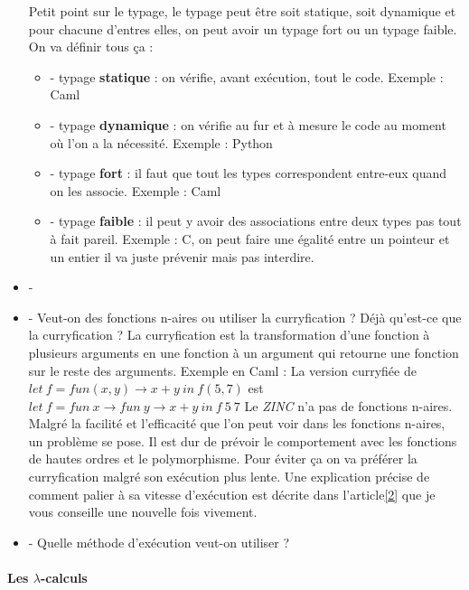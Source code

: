 \documentclass[10pt,a4paper]{article}
\begin{document}
\begin{itemize}
					Petit point sur le typage, le typage peut être soit statique, soit dynamique et pour chacune d'entres elles, on peut avoir un typage fort ou un typage faible. On va définir tous ça :
					\begin{itemize}
						\item[] - typage \textbf{statique} : on vérifie, avant exécution, tout le code. Exemple : Caml
						\item[] - typage \textbf{dynamique} : on vérifie au fur et à mesure le code au moment où l'on a la nécessité. Exemple : Python
						\item[] - typage \textbf{fort} : il faut que tout les types correspondent entre-eux quand on les associe. Exemple : Caml 
						\item[] - typage \textbf{faible} : il peut y avoir des associations entre deux types pas tout à fait pareil. Exemple : C, on peut faire une égalité entre un pointeur et un entier il va juste prévenir mais pas interdire. 
					\end{itemize} 
					\item[] -
					\item[] - Veut-on des fonctions n-aires ou utiliser la curryfication ? Déjà qu'est-ce que la curryfication ? La curryfication est la transformation d'une fonction à plusieurs arguments en une fonction à un argument qui retourne une fonction sur le reste des arguments.
					\smallbreak
					Exemple en Caml : La version curryfiée de $let~f = fun(x,y) \rightarrow x+y~in~f(5,7)$ est\\ $let~f = fun~x \rightarrow fun~y \rightarrow x+y~in~f~5~7$ 
					\smallbreak
					Le \textit{ZINC} n'a pas de fonctions n-aires. Malgré la facilité et l'efficacité que l'on peut voir dans les fonctions n-aires, un problème se pose. Il est dur de prévoir le comportement avec les fonctions de hautes ordres et le polymorphisme. Pour éviter ça on va préférer la curryfication malgré son exécution plus lente. Une explication précise de comment palier à sa vitesse d'exécution est décrite dans l'article\hyperref[ZINC]{[2]} que je vous conseille une nouvelle fois vivement.
					\item[] - Quelle méthode d'exécution veut-on utiliser ?
 				\end{itemize}
				\newpage	
				
				
	
			\paragraph{Les  $\lambda$-calculs}
			
\end{document}

